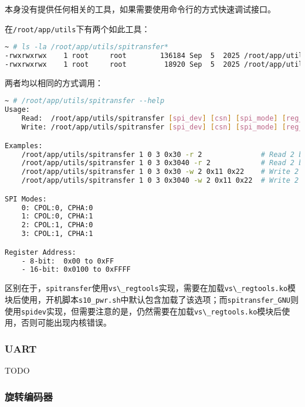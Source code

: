 \documentclass[UTF8]{ctexart}
\newcommand{\code}[1]{\colorbox{gray!10}{\lstinline[style=inlinecode]|#1|}}
\begin{document}
本身没有提供任何相关的工具，如果需要使用命令行的方式快速调试接口。

在\code{/root/app/utils}下有两个如此工具：

\begin{lstlisting}[language=sh]
~ # ls -la /root/app/utils/spitransfer*
-rwxrwxrwx    1 root     root        136184 Sep  5  2025 /root/app/utils/spitransfer
-rwxrwxrwx    1 root     root         18920 Sep  5  2025 /root/app/utils/spitransfer_GNU    
\end{lstlisting}

\noindent 两者均以相同的方式调用：

\begin{lstlisting}[language=sh]
~ # /root/app/utils/spitransfer --help
Usage:
    Read:  /root/app/utils/spitransfer [spi_dev] [csn] [spi_mode] [reg_addr] -r [bytes]
    Write: /root/app/utils/spitransfer [spi_dev] [csn] [spi_mode] [reg_addr] -w [data_bytes] [data1] [data2] ...

Examples:
    /root/app/utils/spitransfer 1 0 3 0x30 -r 2              # Read 2 bytes from 8-bit register 0x30
    /root/app/utils/spitransfer 1 0 3 0x3040 -r 2            # Read 2 bytes from 16-bit register 0x3040
    /root/app/utils/spitransfer 1 0 3 0x30 -w 2 0x11 0x22    # Write 2 bytes (0x11,0x22) to register 0x30
    /root/app/utils/spitransfer 1 0 3 0x3040 -w 2 0x11 0x22  # Write 2 bytes (0x11,0x22) to 16-bit register 0x3040

SPI Modes:
    0: CPOL:0, CPHA:0
    1: CPOL:0, CPHA:1
    2: CPOL:1, CPHA:0
    3: CPOL:1, CPHA:1

Register Address:
    - 8-bit:  0x00 to 0xFF
    - 16-bit: 0x0100 to 0xFFFF    
\end{lstlisting}

区别在于，\code{spitransfer}使用\code{vs\_regtools}实现，需要在加载\code{vs\_regtools.ko}模块后使用，开机脚本\code{s10_pwr.sh}中默认包含加载了该选项；而\code{spitransfer_GNU}则使用\code{spidev}实现，但需要注意的是，仍然需要在加载\code{vs\_regtools.ko}模块后使用，否则可能出现内核错误。

\subsubsection{UART}

TODO

\subsubsection{旋转编码器}
\end{document}
